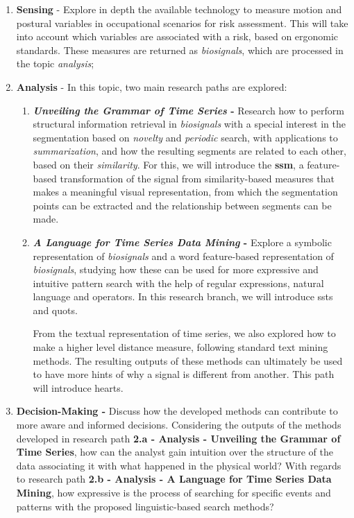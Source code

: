 \begin{enumerate}

\item \textbf{Sensing} - Explore in depth the available technology to measure motion and postural variables in occupational scenarios for risk assessment. This will take into account which variables are associated with a risk, based on ergonomic standards. These measures are returned as \textit{biosignals}, which are processed in the topic \textit{analysis};

\item \textbf{Analysis} - In this topic, two main research paths are explored: 
	\begin{enumerate}
		\item \textbf{\textit{Unveiling the Grammar of Time Series} -} Research how to perform structural information retrieval in \textit{biosignals} with a special interest in the segmentation based on \textit{novelty} and \textit{periodic} search, with applications to \textit{summarization}, and how the resulting segments are related to each other, based on their \textit{similarity}. For this, we will introduce the \textbf{\gls{ssm}}, a feature-based transformation of the signal from similarity-based measures that makes a meaningful visual representation, from which the segmentation points can be extracted and the relationship between segments can be made. 
		\item \textbf{\textit{A Language for Time Series Data Mining} - } Explore a symbolic representation of \textit{biosignals} and a word feature-based representation of \textit{biosignals}, studying how these can be used for more expressive and intuitive pattern search with the help of regular expressions, natural language and operators. In this research branch, we will introduce \gls{ssts} and \gls{quots}. 
		
From the textual representation of time series, we also explored how to make a higher level distance measure, following standard text mining methods. The resulting outputs of these methods can ultimately be used to have more hints of why a signal is different from another. This path will introduce \gls{hearts}.

	\end{enumerate}

\item \textbf{Decision-Making -} Discuss how the developed methods can contribute to more aware and informed decisions. Considering the outputs of the methods developed in research path \textbf{2.a - Analysis - Unveiling the Grammar of Time Series}, how can the analyst gain intuition over the structure of the data associating it with what happened in the physical world? With regards to research path \textbf{2.b - Analysis - A Language for Time Series Data Mining}, how expressive is the process of searching for specific events and patterns with the proposed linguistic-based search methods?

\end{enumerate}

